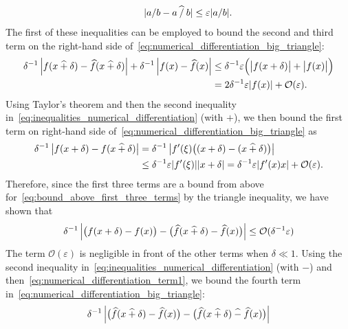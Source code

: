 \begin{solution}
\begin{align}
        \qquad \lvert a/b - a \mathbin{\widehat /} b\rvert \leq \varepsilon \lvert a/b \rvert.
    \end{align}
    The first of these inequalities
    can be employed to bound the second and third term on the right-hand side of~\eqref{eq:numerical_differentiation_big_triangle}:
    \begin{align*}
        \nonumber
        \delta^{-1}\left\lvert f(x \mathbin{\widehat +} \delta) - \widehat f(x \mathbin{\widehat +} \delta) \right\rvert
        + \delta^{-1} \left\lvert f(x) - \widehat f(x) \right\rvert 
        &\leq \delta^{-1} \varepsilon \Bigl( \bigl\lvert f(x + \delta) \bigr\rvert + \bigl\lvert f(x) \bigr\rvert  \Bigr) \\
        &= 2 \delta^{-1} \varepsilon \lvert f(x)\rvert + \mathcal O(\varepsilon).
    \end{align*}
    Using Taylor's theorem and then the second inequality in~\eqref{eq:inequalities_numerical_differentiation} (with $+$),
    we then bound the first term on right-hand side of~\eqref{eq:numerical_differentiation_big_triangle} as
    \begin{align*}
        \delta^{-1}\left\lvert f(x + \delta) - f(x \mathbin{\widehat +} \delta) \right\rvert
        &= \delta^{-1} \left\lvert f'(\xi) \bigl( (x + \delta) - (x \mathbin{\widehat +} \delta)  \bigr) \right\rvert \\
        &\leq \delta^{-1} \varepsilon \lvert f'(\xi) \rvert \lvert x + \delta \rvert
        = \delta^{-1} \varepsilon \lvert f'(x) x \rvert  + \mathcal O(\varepsilon).
    \end{align*}
    Therefore, since the first three terms are a bound from above for~\eqref{eq:bound_above_first_three_terms} by the triangle inequality,
    we have shown that
    \begin{equation}
        \label{eq:numerical_differentiation_term1}
        \delta^{-1}
        \left\lvert \bigl( f(x+ \delta) - f(x) \bigr)
        - \bigl(  \widehat f(x \mathbin{\widehat +} \delta) - \widehat f(x) \bigr) \right\rvert
        \leq \mathcal O(\delta^{-1} \varepsilon)
    \end{equation}
    The term $\mathcal O(\varepsilon)$ is negligible in front of the other terms when $\delta \ll 1$.
    Using the second inequality in~\eqref{eq:inequalities_numerical_differentiation} (with $-$) and 
    then~\eqref{eq:numerical_differentiation_term1},
    we bound the fourth term in~\eqref{eq:numerical_differentiation_big_triangle}:
    \begin{align}
        \nonumber
        &\delta^{-1} \left\lvert \bigl( \widehat f(x \madd \delta) - \widehat f(x) \bigr)  - \bigl( \widehat f(x \madd \delta) \msub \widehat f(x) \bigr)  \right\rvert \\

\end{align}
\end{solution}
